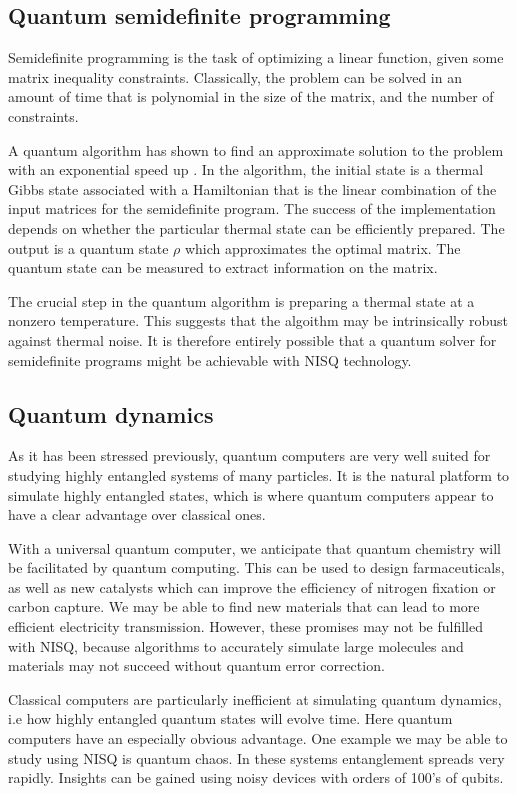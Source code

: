 \subsection{Quantum semidefinite programming}

Semidefinite programming is the task of optimizing a linear function, given some matrix inequality constraints. Classically, the problem can be solved in an amount of time that 
is polynomial in the size of the matrix, and the number of constraints.

A quantum algorithm has shown to find an approximate solution to the problem with an exponential speed up \cite{brandao2017quantum,brandao2017exponential}. In the algorithm, the initial state is a thermal Gibbs state associated with a Hamiltonian that is the linear combination of the input matrices for the semidefinite program. The success of the implementation depends on whether the particular thermal state can be efficiently prepared. 
The output is a quantum state $\rho$ which approximates the optimal matrix. The quantum state can be measured to extract information on the matrix. 


The crucial step in the quantum algorithm is preparing a thermal state at a nonzero temperature. This suggests that the algoithm may be intrinsically robust against thermal noise. It is therefore entirely possible that a quantum solver for semidefinite programs might be achievable with NISQ technology.


\subsection{Quantum dynamics}
As it has been stressed previously, quantum computers are very well suited for studying highly entangled systems of many particles. It is the natural platform to simulate highly entangled states, which is where quantum computers appear to have a clear advantage over classical ones.
 
With a universal quantum computer, we anticipate that quantum chemistry will be facilitated by quantum computing. This can be used to design farmaceuticals, as well as new catalysts which can improve the efficiency of nitrogen fixation or carbon capture. We may be able to find new materials that can lead to more efficient electricity transmission. However, these promises may not be fulfilled with NISQ, because algorithms to accurately simulate large molecules and materials may not succeed without quantum error correction.

Classical computers are particularly inefficient at simulating quantum dynamics, i.e how highly entangled quantum states will evolve time. Here quantum computers have an especially obvious advantage. One example we may be able to study using NISQ is quantum chaos. In these systems entanglement spreads very rapidly. Insights can be gained using noisy devices with orders of 100's of qubits.

